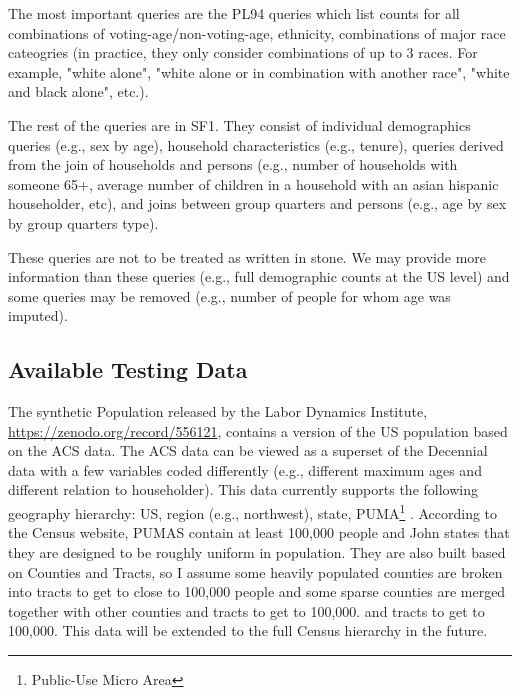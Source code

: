 \documentclass{amsart}
\begin{document}
The most important queries are the PL94 queries which list counts for all combinations of voting-age/non-voting-age, ethnicity, combinations of major race cateogries (in practice, they only consider combinations of up to 3 races. For example, "white alone", "white alone or in combination with another race", "white and black alone", etc.).

The rest of the queries are in SF1. They consist of individual demographics queries (e.g., sex by age), household characteristics (e.g., tenure), queries derived from the join of households and persons (e.g., number of households with someone 65+, average number of children in a household with an asian hispanic householder, etc), and joins between group quarters and persons (e.g., age by sex by group quarters type).

These queries are not to be treated as written in stone. We may provide more information than these queries (e.g., full demographic counts at the US level) and some queries may be removed (e.g., number of people for whom age was imputed).
\subsection{Available Testing Data}
The synthetic Population released by the Labor Dynamics Institute, \url{https://zenodo.org/record/556121}, contains a version of the US population based on the ACS data. The ACS data can be viewed as a superset of the Decennial data with a few variables coded differently (e.g., different maximum ages and different relation to householder). This data currently supports the following geography hierarchy: US, region (e.g., northwest), state, PUMA\footnote{Public-Use Micro Area}  . According to the Census website, PUMAS contain at least 100,000 people and John states that they are designed to be roughly uniform in population. They are also built based on Counties and Tracts, so I assume some heavily populated counties are broken into tracts to get to close to 100,000 people and some sparse counties are merged together with other counties and tracts to get to 100,000.  and tracts to get to 100,000. This data will be extended to the full Census hierarchy in the future.
\end{document}
